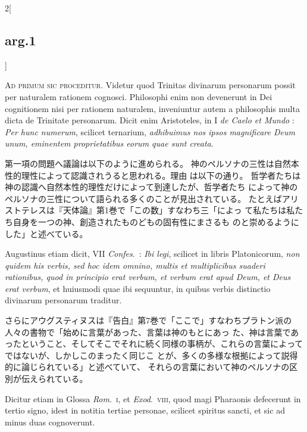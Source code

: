 \documentclass[paper=a4paper,fontsize=10pt,jafontsize=9pt,titlepage]{jlreq}
\begin{document}
{}
\setcounter{section}{1}
\setcounter{subsection}{0}

\begin{paracol}{2}[\subsection{arg.1}]

{\scshape Ad primum sic proceditur}. Videtur quod Trinitas divinarum personarum
possit per naturalem rationem cognosci. Philosophi enim non devenerunt
in Dei cognitionem nisi per rationem naturalem, inveniuntur autem a
philosophis multa dicta de Trinitate personarum. Dicit enim
Aristoteles, in I {\itshape de Caelo et Mundo} : {\itshape Per hunc numerum}, scilicet
ternarium, {\itshape adhibuimus nos ipsos magnificare Deum unum, eminentem
proprietatibus eorum quae sunt creata}.

\switchcolumn

第一項の問題へ議論は以下のように進められる。
神のペルソナの三性は自然本性的理性によって認識されうると思われる。理由
 は以下の通り。
哲学者たちは神の認識へ自然本性的理性だけによって到達したが、哲学者たち
 によって神のペルソナの三性について語られる多くのことが見出されている。
 たとえばアリストテレスは『天体論』第1巻で「この数」すなわち三「によっ
 て私たちは私たち自身を一つの神、創造されたものどもの固有性にまさるも
 のと崇めるようにした」と述べている。

\switchcolumn*

Augustinus etiam dicit, VII
{\itshape Confes}.~: {\itshape Ibi legi}, scilicet in libris Platonicorum, {\itshape non quidem his
verbis, sed hoc idem omnino, multis et multiplicibus suaderi
rationibus, quod in principio erat verbum, et verbum erat apud Deum,
et Deus erat verbum}, et huiusmodi quae ibi sequuntur, in quibus verbis
distinctio divinarum personarum traditur.

\switchcolumn

さらにアウグスティヌスは『告白』第7巻で「ここで」すなわちプラトン派の
 人々の書物で「始めに言葉があった、言葉は神のもとにあっ
 た、神は言葉であったということ、そしてそこでそれに続く同様の事柄が、これらの言葉によってではないが、しかしこのまったく同じこ
 とが、多くの多様な根拠によって説得的に論じられている」と述べていて、
 それらの言葉において神のペルソナの区別が伝えられている。

\switchcolumn*

Dicitur etiam in Glossa
{\itshape Rom}.~{\scshape i}, et {\itshape Exod}.~{\scshape viii}, quod magi Pharaonis defecerunt in tertio signo,
idest in notitia tertiae personae, scilicet spiritus sancti, et sic ad
minus duas cognoverunt.


\end{paracol}
\end{document}
